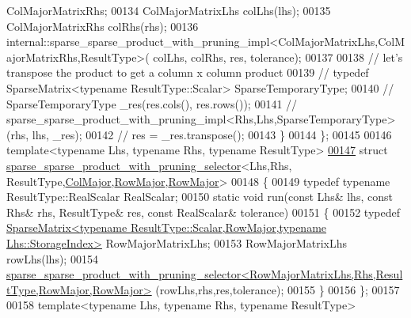 \begin{DoxyCode}
       ColMajorMatrixRhs;
00134     ColMajorMatrixLhs colLhs(lhs);
00135     ColMajorMatrixRhs colRhs(rhs);
00136     internal::sparse\_sparse\_product\_with\_pruning\_impl<ColMajorMatrixLhs,ColMajorMatrixRhs,ResultType>(
      colLhs, colRhs, res, tolerance);
00137 
00138     \textcolor{comment}{// let's transpose the product to get a column x column product}
00139 \textcolor{comment}{//     typedef SparseMatrix<typename ResultType::Scalar> SparseTemporaryType;}
00140 \textcolor{comment}{//     SparseTemporaryType \_res(res.cols(), res.rows());}
00141 \textcolor{comment}{//     sparse\_sparse\_product\_with\_pruning\_impl<Rhs,Lhs,SparseTemporaryType>(rhs, lhs, \_res);}
00142 \textcolor{comment}{//     res = \_res.transpose();}
00143   \}
00144 \};
00145 
00146 \textcolor{keyword}{template}<\textcolor{keyword}{typename} Lhs, \textcolor{keyword}{typename} Rhs, \textcolor{keyword}{typename} ResultType>
\hyperlink{struct_eigen_1_1internal_1_1sparse__sparse__product__with__pruning__selector_3_01_lhs_00_01_rhs_8b2f3809f6470cfe6598a7debb24ca1d}{00147} \textcolor{keyword}{struct }\hyperlink{struct_eigen_1_1internal_1_1sparse__sparse__product__with__pruning__selector}{sparse\_sparse\_product\_with\_pruning\_selector}<Lhs,Rhs,
      ResultType,\hyperlink{group__enums_ggaacded1a18ae58b0f554751f6cdf9eb13a0cbd4bdd0abcfc0224c5fcb5e4f6669a}{ColMajor},\hyperlink{group__enums_ggaacded1a18ae58b0f554751f6cdf9eb13acfcde9cd8677c5f7caf6bd603666aae3}{RowMajor},\hyperlink{group__enums_ggaacded1a18ae58b0f554751f6cdf9eb13acfcde9cd8677c5f7caf6bd603666aae3}{RowMajor}>
00148 \{
00149   \textcolor{keyword}{typedef} \textcolor{keyword}{typename} ResultType::RealScalar RealScalar;
00150   \textcolor{keyword}{static} \textcolor{keywordtype}{void} run(\textcolor{keyword}{const} Lhs& lhs, \textcolor{keyword}{const} Rhs& rhs, ResultType& res, \textcolor{keyword}{const} RealScalar& tolerance)
00151   \{
00152     \textcolor{keyword}{typedef} 
      \hyperlink{group___sparse_core___module_class_eigen_1_1_sparse_matrix}{SparseMatrix<typename ResultType::Scalar,RowMajor,typename Lhs::StorageIndex>}
       RowMajorMatrixLhs;
00153     RowMajorMatrixLhs rowLhs(lhs);
00154     
      \hyperlink{struct_eigen_1_1internal_1_1sparse__sparse__product__with__pruning__selector}{sparse\_sparse\_product\_with\_pruning\_selector<RowMajorMatrixLhs,Rhs,ResultType,RowMajor,RowMajor>}
      (rowLhs,rhs,res,tolerance);
00155   \}
00156 \};
00157 
00158 \textcolor{keyword}{template}<\textcolor{keyword}{typename} Lhs, \textcolor{keyword}{typename} Rhs, \textcolor{keyword}{typename} ResultType>

\end{DoxyCode}
